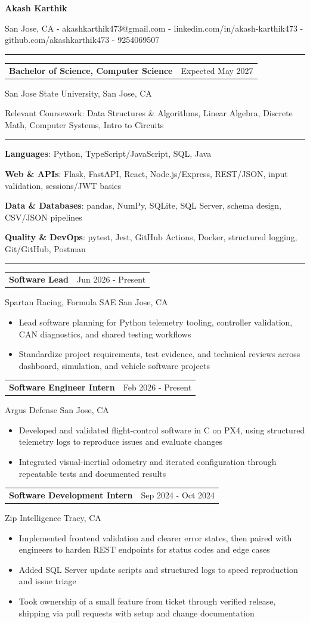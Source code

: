 \documentclass[10pt,letterpaper]{article}
\makeatletter
\newcommand{\bodyfont}{\fontsize{10}{11.1}\selectfont}
\newcommand{\name}[1]{%
  \begin{center}
    {\fontsize{16.5}{17.5}\selectfont\textbf{#1}}
  \end{center}
  \vspace{-4pt}
}
\newcommand{\contact}[1]{%
  \begin{center}
    {\fontsize{9.6}{10.6}\selectfont #1}
  \end{center}
  \vspace{5pt}
}
\newcommand{\sectionheader}[1]{%
  \vspace{4pt}
  \noindent\rule{\textwidth}{0.35pt}\par
  \vspace{4pt}
  \noindent{\fontsize{12.5}{13.5}\selectfont\textbf{#1}}\par
  \vspace{3pt}
}
\newcommand{\roleline}[2]{%
  \noindent
  \begin{tabular*}{\textwidth}{@{\extracolsep{\fill}} l r}
    \textbf{#1} & #2 \\
  \end{tabular*}
  \vspace{-2pt}
}
\newcommand{\orgline}[1]{%
  #1\par
  \vspace{1pt}
}
\newcommand{\techline}[1]{%
  #1\par
  \vspace{1pt}
}
\newcommand{\entryspace}{\vspace{2pt}}
\makeatother
\begin{document}
\bodyfont

\name{Akash Karthik}

\contact{San Jose, CA - akashkarthik473@gmail.com - linkedin.com/in/akash-karthik473 - github.com/akashkarthik473 - 9254069507}

\sectionheader{EDUCATION}

\roleline{Bachelor of Science, Computer Science}{Expected May 2027}
\orgline{San Jose State University, San Jose, CA}
\orgline{Relevant Coursework: Data Structures \& Algorithms, Linear Algebra, Discrete Math, Computer Systems, Intro to Circuits}

\sectionheader{TECHNICAL SKILLS}

\techline{\textbf{Languages}: Python, TypeScript/JavaScript, SQL, Java}
\techline{\textbf{Web \& APIs}: Flask, FastAPI, React, Node.js/Express, REST/JSON, input validation, sessions/JWT basics}
\techline{\textbf{Data \& Databases}: pandas, NumPy, SQLite, SQL Server, schema design, CSV/JSON pipelines}
\techline{\textbf{Quality \& DevOps}: pytest, Jest, GitHub Actions, Docker, structured logging, Git/GitHub, Postman}

\sectionheader{EXPERIENCE}

\roleline{Software Lead}{Jun 2026 - Present}
\orgline{Spartan Racing, Formula SAE\textbar{} San Jose, CA}
\begin{itemize}
  \item Lead software planning for Python telemetry tooling, controller validation, CAN diagnostics, and shared testing workflows
  \item Standardize project requirements, test evidence, and technical reviews across dashboard, simulation, and vehicle software projects
\end{itemize}

\entryspace

\roleline{Software Engineer Intern}{Feb 2026 - Present}
\orgline{Argus Defense \textbar{} San Jose, CA}
\begin{itemize}
  \item Developed and validated flight-control software in C on PX4, using structured telemetry logs to reproduce issues and evaluate changes
  \item Integrated visual-inertial odometry and iterated configuration through repeatable tests and documented results
\end{itemize}

\entryspace

\roleline{Software Development Intern}{Sep 2024 - Oct 2024}
\orgline{Zip Intelligence \textbar{} Tracy, CA}
\begin{itemize}
  \item Implemented frontend validation and clearer error states, then paired with engineers to harden REST endpoints for status codes and edge cases
  \item Added SQL Server update scripts and structured logs to speed reproduction and issue triage
  \item Took ownership of a small feature from ticket through verified release, shipping via pull requests with setup and change documentation
\end{itemize}
\end{document}
